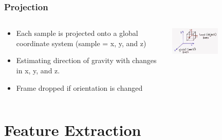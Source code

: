 \documentclass{beamer}
\begin{document}
\begin{frame}
  \frametitle{Projection}
  \begin{columns}
  \begin{column}{.7\textwidth}
  
  	\begin{itemize}
  		\item Each sample is projected onto a global coordinate system (sample = {x, y, and z})
  		\linebreak
  		\item Estimating direction of gravity with changes in x, y, and z. 
  		\linebreak
  		\item Frame dropped if orientation is changed  
  	\end{itemize}
  
  \end{column}
  
  \begin{column}{0.7\textwidth}
   \includegraphics[width=0.5\textwidth]{Illustrations/global.jpg}
   \\

       
  \end{column}
  
  \end{columns}
\end{frame}




\section[Feature Extraction]{Feature Extraction}
\end{document}
